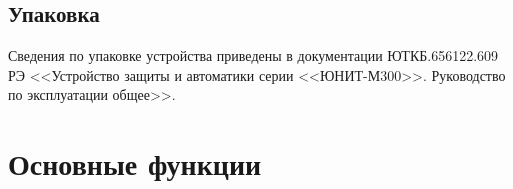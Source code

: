 \documentclass[a4paper, 12pt,table, hidelinks, DIV=calc]{extarticle} %
\begin{document}
\color{uniblue}\subsection{Упаковка}\color{black}
Сведения по упаковке устройства приведены в документации ЮТКБ.656122.609 РЭ <<Устройство защиты и автоматики серии <<ЮНИТ-М300>>. Руководство по эксплуатации общее>>.
\newpage
\color{uniblue}\section[Основные функции]{Основные функции}\label{sec:funcs}
\color{black}

\color{black}
\end{document}
